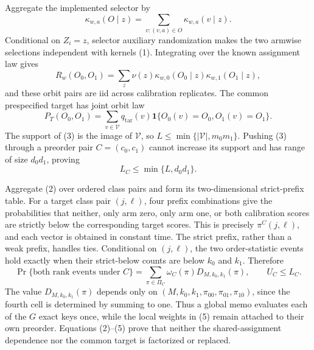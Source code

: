 Aggregate the implemented selector by
\[
\kappa_{w,a}(O\mid z)=\sum_{v:(v,a)\in O}\kappa_{w,a}(v\mid z).
\tag{1}
\]
Conditional on \(Z_i=z\), selector auxiliary randomization makes the two armwise selections independent with kernels (1). Integrating over the known assignment law gives
\[
R_w(O_0,O_1)=\sum_z\nu(z)\kappa_{w,0}(O_0\mid z)\kappa_{w,1}(O_1\mid z),
\tag{2}
\]
and these orbit pairs are iid across calibration replicates. The common prespecified target has joint orbit law
\[
P_T(O_0,O_1)=\sum_{v\in\mathcal V}q_{\mathrm{tar}}(v)
\mathbf 1\{O_0(v)=O_0, O_1(v)=O_1\}.
\tag{3}
\]
The support of (3) is the image of \(\mathcal V\), so \(L\le\min\{|\mathcal V|,m_0m_1\}\). Pushing (3) through a preorder pair \(C=(c_0,c_1)\) cannot increase its support and has range of size \(d_0d_1\), proving
\[
L_C\le\min\{L,d_0d_1\}.
\tag{4}
\]

Aggregate (2) over ordered class pairs and form its two-dimensional strict-prefix table. For a target class pair \((j,\ell)\), four prefix combinations give the probabilities that neither, only arm zero, only arm one, or both calibration scores are strictly below the corresponding target scores. This is precisely \(\pi^C(j,\ell)\), and each vector is obtained in constant time. The strict prefix, rather than a weak prefix, handles ties. Conditional on \((j,\ell)\), the two order-statistic events hold exactly when their strict-below counts are below \(k_0\) and \(k_1\). Therefore
\[
\Pr\{\text{both rank events under }C\}
=\sum_{\pi\in\Pi_C}\omega_C(\pi)D_{M,k_0,k_1}(\pi),
\qquad U_C\le L_C.
\tag{5}
\]
The value \(D_{M,k_0,k_1}(\pi)\) depends only on \((M,k_0,k_1,\pi_{00},\pi_{01},\pi_{10})\), since the fourth cell is determined by summing to one. Thus a global memo evaluates each of the \(G\) exact keys once, while the local weights in (5) remain attached to their own preorder. Equations (2)--(5) prove that neither the shared-assignment dependence nor the common target is factorized or replaced.

